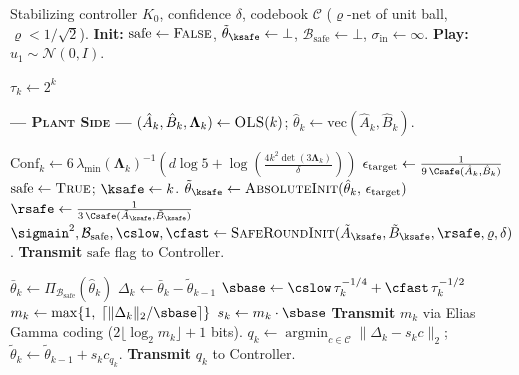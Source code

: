 \documentclass[11pt,journal,onecolumn]{IEEEtran}
\begin{document}
\begin{algorithm}
    \caption{Quantized Certainty Equivalent Control with Adaptive Scale}
    \label{alg:quantized_ce_lqr_proj}
    \begin{algorithmic}[1]
        \Require Stabilizing controller $K_0$, confidence $\delta$, codebook $\mathcal{C}$ ($\varrho$-net of unit ball, $\varrho < 1/\sqrt{2}$).
        \State \textbf{Init:} $\mathrm{safe} \gets \textsc{False}$, $\tilde{\theta}_{\ksafe} \gets \bot$, $\mathcal{B}_{\mathrm{safe}} \gets \bot$, $\sigma_{\mathrm{in}} \gets \infty$.
        \State \textbf{Play:} $u_1 \sim \mathcal{N}(0,I)$.

        \State $\tau_k \gets 2^k$
        \vspace{0.4em}

        \State \textbf{\textsc{--- Plant Side ---}}
        \State $(\hat A_k, \hat B_k, \mathbf{\Lambda}_k) \gets \textsc{OLS}(k)$; \quad $\hat{\theta}_k \gets \mathrm{vec}(\hat A_k, \hat B_k)$.

         
        \State $\mathrm{Conf}_k \gets 6\,\lambda_{\min}(\mathbf{\Lambda}_k)^{-1}\!\left(d\log 5 + \log\!\left(\frac{4k^2\det(3\mathbf{\Lambda}_k)}{\delta}\right)\right)$
            \State $\epsilon_{\mathrm{target}} \gets \frac{1}{9\,\Csafe(\hat A_k, \hat B_k)}$
            \State $\mathrm{safe} \gets \textsc{True}$; \quad $\ksafe \gets k$.
            \State $\tilde\theta_{\ksafe} \gets \textsc{AbsoluteInit}(\hat\theta_k,\, \epsilon_{\mathrm{target}})$ 
            \State $\rsafe \gets \frac{1}{3\,\Csafe(\tilde A_{\ksafe},\tilde B_{\ksafe})}$ 
            \State $\sigmain^2, \mathcal{B}_{\mathrm{safe}}, \cslow, \cfast \gets \textsc{SafeRoundInit}(\tilde A_{\ksafe},\tilde B_{\ksafe}, \rsafe, \varrho, \delta)$.
        \EndIf
        \State \textbf{Transmit} $\mathrm{safe}$ flag to Controller. 

        \Else {}
        \State $\bar{\theta}_k \gets \Pi_{\mathcal{B}_{\mathrm{safe}}}(\hat{\theta}_k)$ 
        \State $\Delta_k \gets \bar{\theta}_k - \tilde{\theta}_{k-1}$ 
        \State $\sbase \gets \cslow\,\tau_k^{-1/4} + \cfast\,\tau_k^{-1/2}$ 
        \State $m_k \gets \max\!\left\{1,\;\left\lceil \|\Delta_k\|_2 / \sbase \right\rceil\right\}$ 
        \State $s_k \gets m_k \cdot \sbase$
        \State \textbf{Transmit} $m_k$ via Elias Gamma coding ($2\lfloor\log_2 m_k\rfloor + 1$ bits).
        \State $q_k \gets \operatorname*{argmin}_{c\in\mathcal{C}} \|\Delta_k - s_k c\|_2$; \quad $\tilde{\theta}_k \gets \tilde{\theta}_{k-1} + s_k c_{q_k}$.
        \State \textbf{Transmit} $q_k$ to Controller.
        \EndIf


\end{algorithmic}
\end{algorithm}
\end{document}
